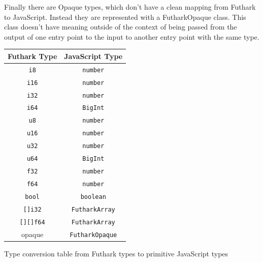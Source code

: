 \documentclass[11pt]{book}
\newcommand{\textBf}[1]{\textbf{#1}}
\begin{document}
Finally there are Opaque types, which don't have a clean mapping from Futhark to JavaScript. Instead they are represented with a FutharkOpaque class. This class doesn't have meaning outside of the context of being passed from the output of one entry point to the input to another entry point with the same type.

\begin{listing}[H] 
\begin{table}[H]
\centering

\begin{tabular}{|c|c|}
\hline
\textBf{Futhark Type} & \textBf{JavaScript Type}   \\ \hline
\texttt{i8}                    & \texttt{number}                                  \\ \hline
\texttt{i16}                   & \texttt{number}                                 \\ \hline
\texttt{i32}                   & \texttt{number}                               \\ \hline
\texttt{i64}                   & \texttt{BigInt}                             \\ \hline
\texttt{u8}                    & \texttt{number}                              \\ \hline
\texttt{u16}                   & \texttt{number}                               \\ \hline
\texttt{u32}                   & \texttt{number}                              \\ \hline
\texttt{u64}                   & \texttt{BigInt}                           \\ \hline
\texttt{f32}                   & \texttt{number}                            \\ \hline
\texttt{f64}                   & \texttt{number}                           \\ \hline
\texttt{bool}                  & \texttt{boolean}                            \\ \hline
\texttt{[]i32}                 & \texttt{FutharkArray}                       \\ \hline
\texttt{[][]f64}               & \texttt{FutharkArray}                       \\ \hline
opaque                  & \texttt{FutharkOpaque}                     \\ \hline
\end{tabular}
\end{table}
\caption{Type conversion table from Futhark types to primitive JavaScript types}
\label{table:types}
\end{listing}
\end{document}
